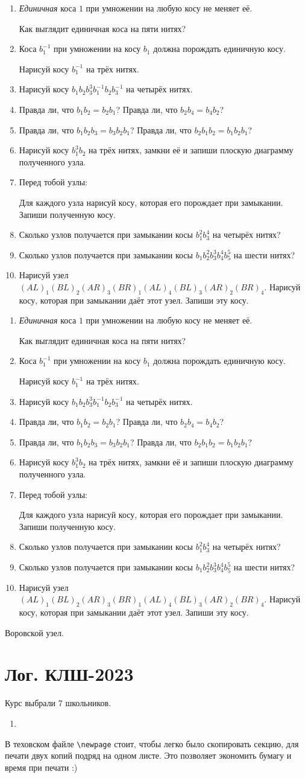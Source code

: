 \documentclass[12pt]{article}
\theoremstyle{definition}
\begin{document}
\newcommand{\daytwo}{
\begin{enumerate}
\item  \textit{Единичная} коса $1$ при умножении на любую косу не меняет её.

Как выглядит единичная коса на пяти нитях?
\item Коса $b_1^{-1}$ при умножении на косу $b_1$ должна порождать единичную косу.

Нарисуй косу $b_1^{-1}$ на трёх нитях.
\item Нарисуй косу $b_1 b_2 b_3^3 b_1^{-1} b_2 b_3^{-1}$ на четырёх нитях.
\item Правда ли, что $b_1 b_2 = b_2 b_1$? Правда ли, что $b_2 b_4 = b_4 b_2$?
\item Правда ли, что $b_1 b_2 b_3 = b_3 b_2 b_1$? Правда ли, что $b_2 b_1 b_2 = b_1 b_2 b_1$?
\item Нарисуй косу $b_1^3 b_2$ на трёх нитях, замкни её и запиши плоскую диаграмму полученного узла.
\item Перед тобой узлы:



Для каждого узла нарисуй косу, которая его порождает при замыкании. 
Запиши полученную косу.
\item Сколько узлов получается при замыкании косы $b_1^2 b_3^4$ на четырёх нитях?
\item Сколько узлов получается при замыкании косы $b_1 b_2^2 b_3^3 b_4^4 b_5^5$ на шести нитях?
\item Нарисуй узел $(AL)_1 (BL)_2 (AR)_3 (BR)_1 (AL)_4 (BL)_3 (AR)_2 (BR)_4$.
Нарисуй косу, которая при замыкании даёт этот узел. Запиши эту косу. 
\end{enumerate}
}

\newpage
\daytwo
\vfill
\daytwo

\newpage

Воровской узел. 




\newpage

\section{Лог. КЛШ-2023}

Курс выбрали 7 школьников.

\begin{enumerate}
  \item 
\end{enumerate}

В теховском файле \verb|\newpage| стоит, чтобы легко было скопировать секцию, для печати двух копий подряд на одном листе.
Это позволяет экономить бумагу и время при печати :)
\end{document}
